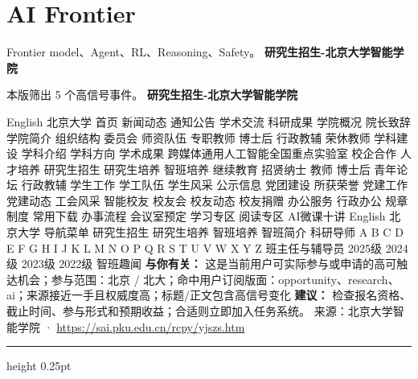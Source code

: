 \documentclass[10.5pt]{ctexart}
\begin{document}
\section*{AI Frontier}
{\color{ormuted} Frontier model、Agent、RL、Reasoning、Safety。}
\vspace{2mm}
{\LARGE\bfseries 研究生招生-北京大学智能学院}\par
\vspace{1mm}
{\color{ormuted} 本版筛出 5 个高信号事件。}
\vspace{3mm}
{\Large\bfseries 研究生招生-北京大学智能学院}\par
English 北京大学 首页 新闻动态 通知公告 学术交流 科研成果 学院概况 院长致辞 学院简介 组织结构 委员会 师资队伍 专职教师 博士后 行政教辅 荣休教师 学科建设 学科介绍 学科方向 学术成果 跨媒体通用人工智能全国重点实验室 校企合作 人才培养 研究生招生 研究生培养 智班培养 继续教育 招贤纳士 教师 博士后 青年论坛 行政教辅 学生工作 学工队伍 学生风采 公示信息 党团建设 所获荣誉 党建工作 党建动态 工会风采 智能校友 校友会 校友动态 校友捐赠 办公服务 行政办公 规章制度 常用下载 办事流程 会议室预定 学习专区 阅读专区 AI微课十讲 English 北京大学 导航菜单 研究生招生 研究生培养 智班培养 智班简介 科研导师 A B C D E F G H I J K L M N O P Q R S T U V W X Y Z 班主任与辅导员 2025级 2024级 2023级 2022级 智班趣闻
\textbf{与你有关：} 这是当前用户可实际参与或申请的高可触达机会；参与范围：北京 / 北大；命中用户订阅版面：opportunity、research、ai；来源接近一手且权威度高；标题/正文包含高信号变化
\textbf{建议：} 检查报名资格、截止时间、参与形式和预期收益；合适则立即加入任务系统。
{\footnotesize\color{ormuted} 来源：北京大学智能学院 · \url{https://sai.pku.edu.cn/rcpy/yjszs.htm}}
\vspace{4mm}
\hrule height 0.25pt
\vspace{3mm}
\end{document}
